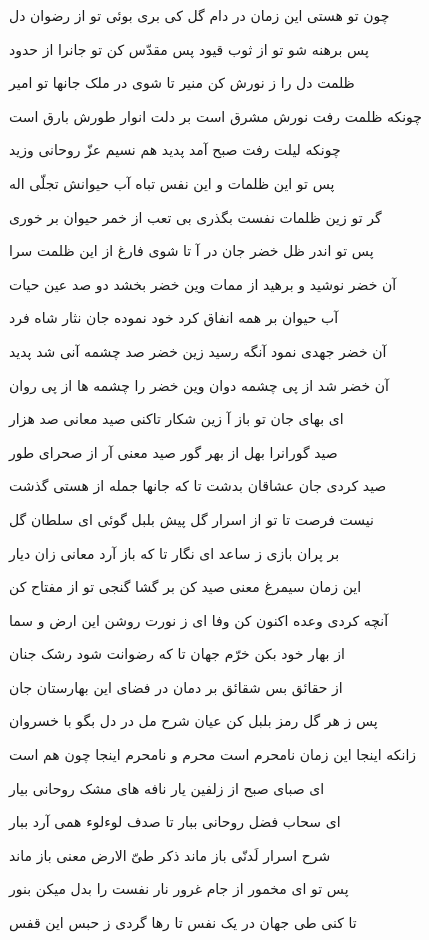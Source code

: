 چون تو هستى اين زمان در دام گل
کى برى بوئى تو از رضوان دل

پس برهنه شو تو از ثوب قيود
پس مقدّس کن تو جانرا از حدود

ظلمت دل را ز نورش کن منير
تا شوى در ملک جانها تو امير

چونکه ظلمت رفت نورش مشرق است
بر دلت انوار طورش بارق است

چونکه ليلت رفت صبح آمد پديد
هم نسيم عزّ روحانى وزيد

پس تو اين ظلمات و اين نفس تباه
آب حيوانش تجلّى اله

گر تو زين ظلمات نفست بگذرى
بى تعب از خمر حيوان بر خورى

پس تو اندر ظل خضر جان در آ
تا شوى فارغ از اين ظلمت سرا

آن خضر نوشيد و برهيد از ممات
وين خضر بخشد دو صد عين حيات

آب حيوان بر همه انفاق کرد
خود نموده جان نثار شاه فرد

آن خضر جهدى نمود آنگه رسيد
زين خضر صد چشمه آنى شد پديد

آن خضر شد از پى چشمه دوان
وين خضر را چشمه ها از پى روان

اى بهاى جان تو باز آ زين شکار
تاکنى صيد معانى صد هزار

صيد گورانرا بهل از بهر گور
صيد معنى آر از صحراى طور

صيد کردى جان عشاقان بدشت
تا که جانها جمله از هستى گذشت

نيست فرصت تا تو از اسرار گل
پيش بلبل گوئى اى سلطان گل

بر پران بازى ز ساعد اى نگار
تا که باز آرد معانى زان ديار

اين زمان سيمرغ معنى صيد کن
بر گشا گنجى تو از مفتاح کن

آنچه کردى وعده اکنون کن وفا
اى ز نورت روشن اين ارض و سما

از بهار خود بکن خرّم جهان
تا که رضوانت شود رشک جنان

از حقائق بس شقائق بر دمان
در فضاى اين بهارستان جان

پس ز هر گل رمز بلبل کن عيان
شرح مل در دل بگو با خسروان

زانکه اينجا اين زمان نامحرم است
محرم و نامحرم‌ اينجا چون هم است

اى صباى صبح از زلفين يار
نافه هاى مشک روحانى بيار

اى سحاب فضل روحانى ببار
تا صدف لوءلوء همى آرد ببار

شرح اسرار لَدنّى باز ماند
ذکر طىّ الارض معنى باز ماند

پس تو اى مخمور از جام غرور
نار نفست را بدل ميکن بنور

تا کنى طى جهان در يک نفس
تا رها گردى ز حبس اين قفس


